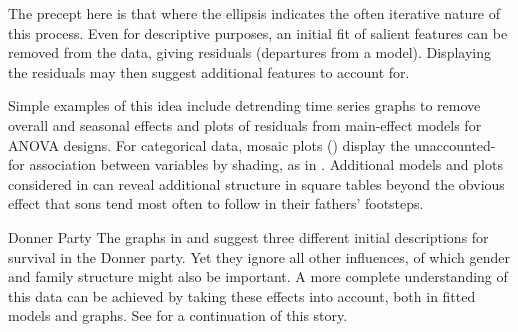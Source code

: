 \documentclass[10pt,krantz2]{krantz}\usepackage[]{graphicx}\usepackage[]{color}
\begin{document}
The precept here is that
where the ellipsis indicates the often iterative nature of this process.
Even for descriptive purposes, an initial fit of salient features can be
removed from the data, giving residuals (departures from a model).
Displaying the residuals may then suggest additional features to account for.

Simple examples of this idea include detrending time series graphs to remove
overall and seasonal effects and plots of residuals from main-effect models
for ANOVA designs.  For categorical data, mosaic plots ()
display the unaccounted-for association between variables by shading,
as in .  Additional models and plots
considered in  can reveal additional structure
in square tables beyond the obvious effect that sons tend most often to
follow in their fathers' footsteps.

\begin{Example}[donner0a]{Donner Party}
The graphs in  and 
suggest three different initial descriptions for survival in the
Donner party.  Yet they ignore all other influences, of which
gender and family structure might also be important.
A more complete understanding of this data can be achieved
by taking these effects into account, both in fitted models
and graphs.  See  for a continuation of this story.
\end{Example}
\end{document}
